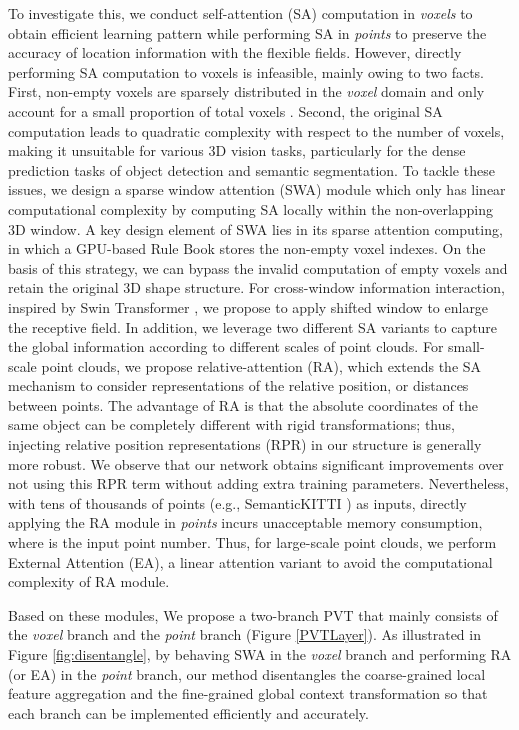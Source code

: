 \documentclass[10pt,twocolumn,letterpaper]{article}
\begin{document}
To investigate this, we conduct self-attention (SA) computation in \emph{voxels} to obtain efficient learning pattern while performing SA in \emph{points} to preserve the accuracy of location information with the flexible fields. 
However, directly performing SA computation to voxels is infeasible, mainly owing to two facts. First, non-empty voxels are sparsely distributed in the \emph{voxel} domain and only account for a small proportion of total voxels \cite{SECOND}. Second, the original SA computation leads to quadratic complexity with respect to the number of voxels, making it unsuitable for various 3D vision tasks, particularly for the dense prediction tasks of object detection and semantic segmentation.
To tackle these issues, we design a sparse window attention (SWA) module which only has linear computational complexity by computing SA locally within the non-overlapping 3D window.
A key design element of SWA lies in its sparse attention computing, in which
a GPU-based Rule Book stores the non-empty voxel indexes. On the basis of this strategy, we can bypass the invalid computation of empty voxels and retain the original 3D shape structure. For cross-window information interaction, inspired by Swin Transformer \cite{liu2021swin}, we propose to apply shifted window to enlarge the receptive field. In addition, we leverage two different SA variants to capture the global information according to different scales of point clouds. For small-scale point clouds, we propose relative-attention (RA), which extends the SA mechanism to consider representations of the relative position, or distances between points. The advantage of RA is that the absolute coordinates of the same object can be completely different with rigid transformations; thus, injecting relative position representations (RPR) in our structure is generally more robust.
We observe that our network obtains significant improvements over not using this RPR term without adding extra training parameters. Nevertheless, with tens of thousands of points (e.g., SemanticKITTI \cite{semanticKT}) as inputs, directly applying the RA module in \emph{points} incurs unacceptable  memory consumption, where  is the input point number. Thus, for large-scale point clouds, we perform External Attention (EA), a linear attention variant to avoid the  computational complexity of RA module.

Based on these modules, We propose a two-branch PVT that mainly consists of the \emph{voxel} branch and the \emph{point} branch (Figure \ref{PVTLayer}). As illustrated in Figure \ref{fig:disentangle}, by behaving SWA in the \emph{voxel} branch and performing RA (or EA) in the \emph{point} branch, our method disentangles the coarse-grained local feature aggregation and the fine-grained global context transformation so that each branch can be implemented efficiently and accurately.
\end{document}
